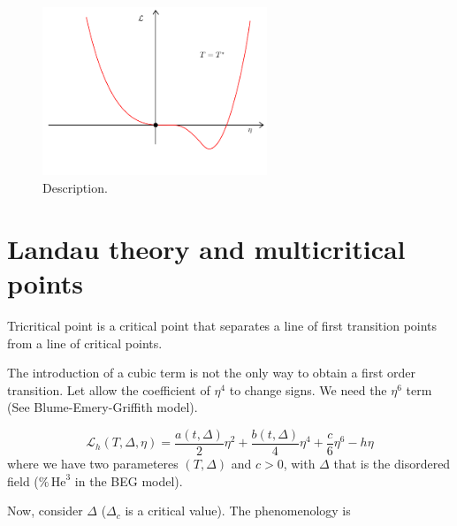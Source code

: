 \documentclass[../main/main.tex]{subfiles}
\begin{document}
\begin{figure}[h!]
\centering
\includegraphics[width=0.6\textwidth]{../lessons/16_image/6.pdf}
\caption{\label{fig:16_6} Description.}
\end{figure}


\section{Landau theory and multicritical points}
Tricritical point is a critical point that separates a line of first transition points from a line of critical points.
\begin{remark}
The introduction of a cubic term is not the only way to obtain a first order transition. Let allow the coefficient of \( \eta ^4 \) to change signs. We need the \( \eta ^6 \) term (See Blume-Emery-Griffith model).
\end{remark}
\begin{equation}
  \mathcal{L}_h (T, \Delta, \eta ) = \frac{a (t,\Delta )}{2} \eta ^2 + \frac{b(t,\Delta )}{4} \eta ^4 + \frac{c}{6} \eta ^6 - h \eta
\end{equation}
where we have two parameteres \( (T,\Delta ) \) and \( c>0 \), with \( \Delta  \) that is the disordered field (\( \% \, \text{He}^3\) in the BEG model).

Now, consider \( \Delta  \) (\( \Delta _c \) is a critical value). The phenomenology is
\end{document}
